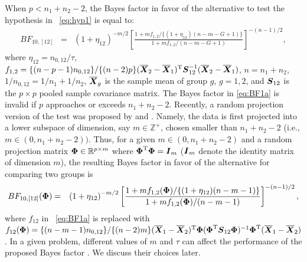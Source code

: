 \documentclass[pdflatex,sn-basic]{sn-jnl}%
\def\be{\begin{eqnarray}}
\def\ee{\end{eqnarray}}
\def\trans{^{\rm T}}
\newcommand{\uI}       {\mbox{\boldmath$I$}}
\newcommand{\uR}       {\mbox{\boldmath$R$}}
\newcommand{\uS}       {\mbox{\boldmath$S$}}
\newcommand{\uX}       {\mbox{\boldmath$X$}}
\newcommand{\uPhi}              {\mbox{\boldmath$\Phi$}}
\theoremstyle{thmstyleone}%
\theoremstyle{thmstyletwo}%
\theoremstyle{thmstylethree}%
\begin{document}
When $p < n_1 +n_2 -2$, the Bayes factor in favor of the alternative to test the hypothesis in ~\eqref{eq:hyp1} is equal to:
\be
BF_{10,[12]} &=& \left(1 + \eta_{12} \right)^{-m/2} \left[\frac{  1 + {m f_{1,2}}/\{(1 + \eta_{12})(n-m-G+1)\}}{ 1 + {m f_{1,2}}/{(n-m-G+1)}  } \right]^{-(n-1)/2}, \label{eq:BF1a}
\ee
where $\eta_{12} = n_{0,12}/\tau$, $f_{1,2}  = \{(n-p-1) n_{0,12}\}/\{(n-2)p\} (\overline{\uX}_2 - \overline{\uX}_1)\trans\uS^{-1}_{12}(\overline{\uX}_2 - \overline{\uX}_1)$, $n = n_1 + n_2$,
 $ 1/n_{0,12} = 1/n_1 + 1/n_2$, $\overline{\uX}_g$ is the sample mean of group $g$, $g = 1, 2$, and $\uS_{12}$ is the $p \times p$ pooled sample covariance matrix.
The Bayes factor in \eqref{eq:BF1a} is invalid if $p$ approaches or exceeds $n_1 + n_2 - 2$. Recently, a random projection version of the test was proposed by \cite{srivastava2014raptt} and \cite{zoh2018powerful}. Namely, the data is first projected into a lower subspace of dimension, say $m \in \mathbb{Z}^{+}$, chosen smaller than $n_1 + n_2 -2$ (i.e., $m \in (0, n_1 + n_2 - 2))$. Thus, for a given $m \in (0, n_1 + n_2 - 2)$ and a random projection matrix $\uPhi \in \mathbb{R}^{p \times m}$ where $\uPhi\trans\uPhi = \uI_{m}$ ($\uI_{m}$ denote the identity matrix of dimension $m$), the resulting Bayes factor in favor of the alternative for comparing two groups is 
\be
BF_{10,[12]}(\uPhi) &=& \left(1 + \eta_{12} \right)^{-m/2} \left[\frac{  1 + {m f_{1,2}(\uPhi)}/\{(1 + \eta_{12})(n-m-1)\}}{ 1 + {m f_{1,2}(\uPhi)}/{(n-m-1)}  } \right]^{-(n-1)/2}, \label{eq:BF1}
\ee
where $f_{12}$ in ~\eqref{eq:BF1a} is replaced with $f_{12}(\uPhi) = \{(n-m-1)n_{0,12} \}/\{(n-2)m\} (\overline{\uX}_1 - \overline{\uX}_2)\trans\uPhi(\uPhi\trans\uS_{12}\uPhi)^{-1}\uPhi\trans(\overline{\uX}_1 - \overline{\uX}_2)$. 
In a given problem, different values of $m$ and $\tau$ can affect the performance of the proposed Bayes factor \citep{zoh2018powerful}. We discuss their choices later.
\end{document}
